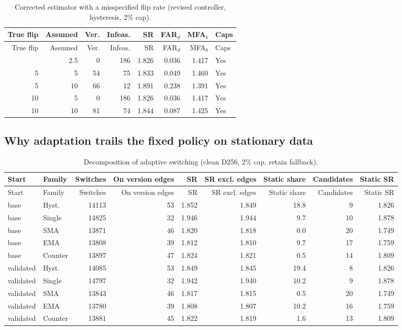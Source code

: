 {\footnotesize\setlength{\tabcolsep}{4pt}
\begin{longtable}{rrrrrrrl}
\caption{Corrected estimator with a misspecified flip rate (revised controller, hysteresis, 2\% cap).}\label{tab:s7_misspec}\\
\toprule
True flip & Assumed & Ver. & Infeas. & SR & FAR$_d$ & MFA$_b$ & Caps\\
\midrule
\endfirsthead
\toprule
True flip & Assumed & Ver. & Infeas. & SR & FAR$_d$ & MFA$_b$ & Caps\\
\midrule
\endhead
\bottomrule
\endfoot
5 & 2.5 & 0 & 186 & 1.826 & 0.036 & 1.417 & Yes\\
5 & 5 & 54 & 75 & 1.833 & 0.049 & 1.460 & Yes\\
5 & 10 & 66 & 12 & 1.891 & 0.238 & 1.391 & Yes\\
10 & 5 & 0 & 186 & 1.826 & 0.036 & 1.417 & Yes\\
10 & 10 & 81 & 74 & 1.844 & 0.087 & 1.425 & Yes\\
\end{longtable}}
\subsection{Why adaptation trails the fixed policy on stationary data}
{\footnotesize\setlength{\tabcolsep}{4pt}
\begin{longtable}{llrrrrrrr}
\caption{Decomposition of adaptive switching (clean D256, 2\% cap, retain fallback).}\label{tab:s7_decomp}\\
\toprule
Start & Family & Switches & On version edges & SR & SR excl. edges & Static share & Candidates & Static SR\\
\midrule
\endfirsthead
\toprule
Start & Family & Switches & On version edges & SR & SR excl. edges & Static share & Candidates & Static SR\\
\midrule
\endhead
\bottomrule
\endfoot
base & Hyst. & 14113 & 53 & 1.852 & 1.849 & 18.8 & 9 & 1.826\\
base & Single & 14825 & 32 & 1.946 & 1.944 & 9.7 & 10 & 1.878\\
base & SMA & 13871 & 46 & 1.820 & 1.818 & 0.0 & 20 & 1.749\\
base & EMA & 13808 & 39 & 1.812 & 1.810 & 9.7 & 17 & 1.759\\
base & Counter & 13897 & 47 & 1.824 & 1.821 & 0.5 & 14 & 1.809\\
validated & Hyst. & 14085 & 53 & 1.849 & 1.845 & 19.4 & 8 & 1.826\\
validated & Single & 14797 & 32 & 1.942 & 1.940 & 10.2 & 9 & 1.878\\
validated & SMA & 13843 & 46 & 1.817 & 1.815 & 0.5 & 20 & 1.749\\
validated & EMA & 13780 & 39 & 1.808 & 1.807 & 10.2 & 16 & 1.759\\
validated & Counter & 13881 & 45 & 1.822 & 1.819 & 1.6 & 13 & 1.809\\
\end{longtable}}
\par\medskip
